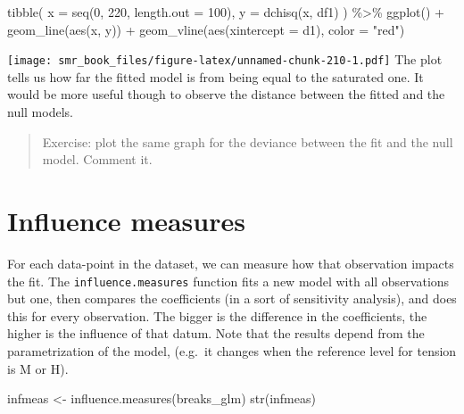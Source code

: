 \documentclass[
  oneside]{book}
\newenvironment{Shaded}{\begin{snugshade}}{\end{snugshade}}
\newcommand{\AttributeTok}[1]{\textcolor[rgb]{0.77,0.63,0.00}{#1}}
\newcommand{\DecValTok}[1]{\textcolor[rgb]{0.00,0.00,0.81}{#1}}
\newcommand{\FunctionTok}[1]{\textcolor[rgb]{0.00,0.00,0.00}{#1}}
\newcommand{\NormalTok}[1]{#1}
\newcommand{\OtherTok}[1]{\textcolor[rgb]{0.56,0.35,0.01}{#1}}
\newcommand{\SpecialCharTok}[1]{\textcolor[rgb]{0.00,0.00,0.00}{#1}}
\newcommand{\StringTok}[1]{\textcolor[rgb]{0.31,0.60,0.02}{#1}}
\begin{document}
\begin{Shaded}
\begin{Highlighting}[]
\FunctionTok{tibble}\NormalTok{(}
  \AttributeTok{x =} \FunctionTok{seq}\NormalTok{(}\DecValTok{0}\NormalTok{, }\DecValTok{220}\NormalTok{, }\AttributeTok{length.out =} \DecValTok{100}\NormalTok{),}
  \AttributeTok{y =} \FunctionTok{dchisq}\NormalTok{(x, df1)}
\NormalTok{) }\SpecialCharTok{\%\textgreater{}\%}
  \FunctionTok{ggplot}\NormalTok{() }\SpecialCharTok{+}
  \FunctionTok{geom\_line}\NormalTok{(}\FunctionTok{aes}\NormalTok{(x, y)) }\SpecialCharTok{+}
  \FunctionTok{geom\_vline}\NormalTok{(}\FunctionTok{aes}\NormalTok{(}\AttributeTok{xintercept =}\NormalTok{ d1), }\AttributeTok{color =} \StringTok{"red"}\NormalTok{)}
\end{Highlighting}
\end{Shaded}

\texttt{[image: smr\_book\_files/figure-latex/unnamed-chunk-210-1.pdf]}
The plot tells us how far the fitted model is from being equal
to the saturated one. It would be more useful though to
observe the distance between the fitted and the null models.

\begin{quote}
Exercise: plot the same graph for the deviance between the fit
and the null model. Comment it.
\end{quote}

\hypertarget{influence-measures}{%
\section{Influence measures}\label{influence-measures}}

For each data-point in the dataset, we can measure how that
observation impacts the fit. The \texttt{influence.measures} function
fits a new model with all observations but one, then compares the
coefficients (in a sort of sensitivity analysis), and does this for
every observation. The bigger is the difference in the coefficients,
the higher is the influence of that datum.
Note that the results depend from the parametrization of the model,
(e.g.~it changes when the reference level for tension is M or H).

\begin{Shaded}
\begin{Highlighting}[]
\NormalTok{infmeas }\OtherTok{\textless{}{-}} \FunctionTok{influence.measures}\NormalTok{(breaks\_glm)}
\FunctionTok{str}\NormalTok{(infmeas)}
\end{Highlighting}
\end{Shaded}
\end{document}
